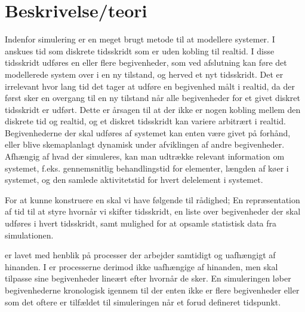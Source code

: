 \section{Beskrivelse/teori} \label{sec:des-teori}


Indenfor simulering er \des en meget brugt metode til at modellere systemer. I 
\des anskues tid som diskrete tidsskridt som er uden kobling til realtid. I 
disse tidsskridt udføres en eller flere begivenheder, som ved afslutning kan 
føre det modellerede system over i en ny tilstand, og herved et nyt tidsskridt. 
Det er irrelevant hvor lang tid det tager at udføre en begivenhed målt i 
realtid, da der først sker en overgang til en ny tilstand når alle begivenheder 
for et givet diskret tidsskridt er udført. Dette er årsagen til at der ikke er 
nogen kobling mellem den diskrete tid og realtid, og et diskret tidsskridt kan 
variere arbitrært i realtid. Begivenhederne der skal udføres af systemet kan 
enten være givet på forhånd, eller blive skemaplanlagt dynamisk under afviklingen 
af andre begivenheder. 
Afhængig af hvad der simuleres, kan man udtrække relevant information om systemet, f.eks. gennemsnitlig behandlingstid for elementer, længden af køer i systemet, og den samlede aktivitetstid for hvert delelement i systemet. 


For at kunne konstruere en \des skal vi have følgende til rådighed; En repræsentation af tid til at styre hvornår vi skifter tidsskridt, en liste over begivenheder der skal udføres i hvert tidsskridt, samt mulighed for at opsamle statistisk data fra simulationen. 

    
\csp er lavet med henblik på processer der arbejder samtidigt og uafhængigt af hinanden. I \des er processerne derimod ikke uafhængige af hinanden, men skal tilpasse sine begivenheder lineært efter hvornår de sker. En simuleringen løber begivenhederne kronologisk igennem til der enten ikke er flere begivenheder eller som det oftere er tilfældet til simuleringen når et forud defineret tidspunkt.


